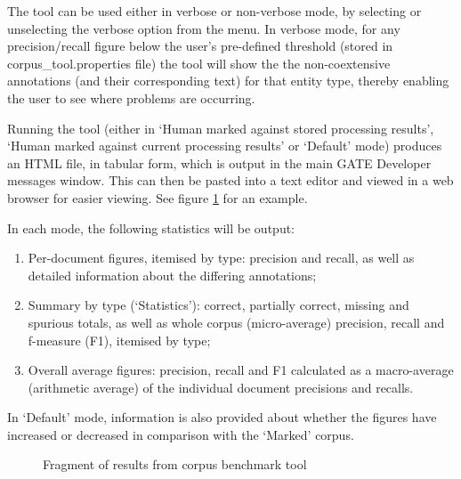 The tool can be used either in verbose or non-verbose mode, by selecting or
unselecting the verbose option from the menu. In verbose mode, for any
precision/recall figure below the user's pre-defined threshold (stored in
corpus\_tool.properties file) the tool will show the the non-coextensive
annotations (and their corresponding text) for that entity type, thereby enabling
the user to see where problems are occurring.


Running the tool (either in `Human marked against stored processing results',
`Human marked against current processing results' or `Default' mode) produces an
HTML file, in tabular form, which is output in the main GATE Developer messages
window. This can then be pasted into a text editor and viewed in a web
browser for easier viewing. See figure \ref{fig:benchmark} for an example.

In each mode, the following statistics will be output:

\begin{enumerate}
  \item Per-document figures, itemised by type: precision and recall, as well as
  detailed information about the differing annotations;
  \item Summary by type (`Statistics'): correct, partially correct, missing
  and spurious totals, as well as whole corpus (micro-average) precision,
  recall and f-measure (F1), itemised by type;
  \item Overall average figures: precision, recall and F1 calculated as a
  macro-average (arithmetic average) of the individual document precisions and recalls.
\end{enumerate}

In `Default' mode, information is also provided about whether the figures have
increased or decreased in comparison with the `Marked' corpus.

\begin{figure}[htbp]
\begin{center}
\end{center}
\caption{Fragment of results from corpus benchmark tool}
\label{fig:benchmark}
\end{figure}

%


